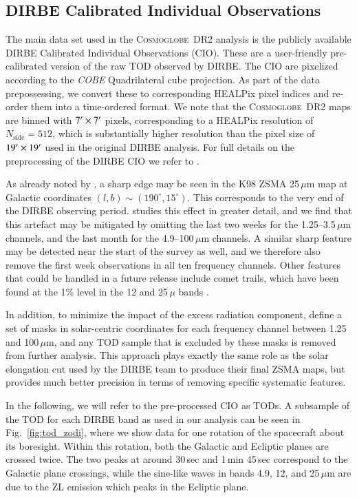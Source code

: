 \documentclass[twocolumn]{aa}
\newcommand{\cosmoglobe}{\textsc{Cosmoglobe}}
\begin{document}
\subsection{DIRBE Calibrated Individual Observations}
The main data set used in the \cosmoglobe\ DR2 analysis is the
publicly available DIRBE Calibrated Individual Observations
(CIO). These are a user-friendly pre-calibrated version of the raw TOD
observed by DIRBE. The CIO are pixelized according to the \textit{COBE}
Quadrilateral cube projection. As part of the data prepossessing, we
convert these to corresponding HEALPix pixel indices and re-order
them into a time-ordered format. We note that the \cosmoglobe\ DR2
maps are binned with $7\arcm \times 7\arcm$ pixels, corresponding to a
HEALPix resolution of $N_{\mathrm{side}}=512$, which is substantially
higher resolution than the pixel size of $19\arcm \times 19\arcm$ used
in the original DIRBE analysis. For full details on the
preprocessing of the DIRBE CIO we refer to \cite{CG02_01}.


As already noted by \citet{Kelsall1998}, a sharp edge may be seen in
the K98 ZSMA 25\,$\mu$m map at Galactic coordinates
$(l,b)\sim(190^{\circ},15^{\circ})$. This corresponds to the very end
of the DIRBE observing period. \citet{CG02_01} studies this effect in
greater detail, and we find that this artefact may be mitigated by
omitting the last two weeks for the 1.25--3.5\,$\mu$m channels, and
the last month for the 4.9--100$\,\mu$m channels. A similar sharp
feature may be detected near the start of the survey as well, and we
therefore also remove the first week observations in all ten frequency
channels. Other features that could be handled in a future release
include comet trails, which have been found at the 1\% level in the 12
and 25\,$\mu$ bands \citep{arendt}.



In addition, to minimize the impact of the excess radiation component,
\citet{CG02_01} define a set of masks in solar-centric coordinates for
each frequency channel between 1.25 and 100\,$\mu$m, and any TOD
sample that is excluded by these masks is removed from further
analysis. This approach plays exactly the same role as the solar
elongation cut used by the DIRBE team to produce their final ZSMA
maps, but provides much better precision in terms of removing specific
systematic features.

In the following, we will refer to the pre-processed CIO as TODs.  A
subsample of the TOD for each DIRBE band as used in our analysis can
be seen in Fig.~\ref{fig:tod_zodi}, where we show data for one
rotation of the spacecraft about its boresight. Within this rotation,
both the Galactic and Ecliptic planes are crossed twice. The two peaks
at around 30\,sec and 1\,min 45\,sec correspond to the Galactic plane
crossings, while the sine-like waves in bands 4.9, 12, and 25\,$\mu$m
are due to the ZL emission which peaks in the Ecliptic plane.
\end{document}
